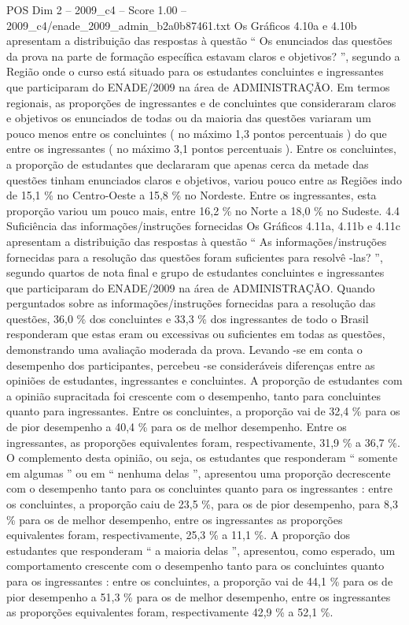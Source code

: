 \begin{textsample}{POS Dim 2 – 2009\_c4 – Score 1.00 – 2009\_c4/enade\_2009\_admin\_b2a0b87461.txt}
Os Gráficos 4.10a e 4.10b apresentam a distribuição das respostas à questão “ Os enunciados das questões da prova na parte de formação específica estavam claros e objetivos? ”, segundo a Região onde o curso está situado para os estudantes concluintes e ingressantes que participaram do ENADE/2009 na área de ADMINISTRAÇÃO.
Em termos regionais, as proporções de ingressantes e de concluintes que consideraram claros e objetivos os enunciados de todas ou da maioria das questões variaram um pouco menos entre os concluintes ( no máximo 1,3 pontos percentuais ) do que entre os ingressantes ( no máximo 3,1 pontos percentuais ).
Entre os concluintes, a proporção de estudantes que declararam que apenas cerca da metade das questões tinham enunciados claros e objetivos, variou pouco entre as Regiões indo de 15,1 \% no Centro-Oeste a 15,8 \% no Nordeste.
Entre os ingressantes, esta proporção variou um pouco mais, entre 16,2 \% no Norte a 18,0 \% no Sudeste. 4.4 Suficiência das informações/instruções fornecidas Os Gráficos 4.11a, 4.11b e 4.11c apresentam a distribuição das respostas à questão “ As informações/instruções fornecidas para a resolução das questões foram suficientes para resolvê -las? ”, segundo quartos de nota final e grupo de estudantes concluintes e ingressantes que participaram do ENADE/2009 na área de ADMINISTRAÇÃO.
Quando perguntados sobre as informações/instruções fornecidas para a resolução das questões, 36,0 \% dos concluintes e 33,3 \% dos ingressantes de todo o Brasil responderam que estas eram ou excessivas ou suficientes em todas as questões, demonstrando uma avaliação moderada da prova.
Levando -se em conta o desempenho dos participantes, percebeu -se consideráveis diferenças entre as opiniões de estudantes, ingressantes e concluintes.
A proporção de estudantes com a opinião supracitada foi crescente com o desempenho, tanto para concluintes quanto para ingressantes.
Entre os concluintes, a proporção vai de 32,4 \% para os de pior desempenho a 40,4 \% para os de melhor desempenho.
Entre os ingressantes, as proporções equivalentes foram, respectivamente, 31,9 \% a 36,7 \%.
O complemento desta opinião, ou seja, os estudantes que responderam “ somente em algumas ” ou em “ nenhuma delas ”, apresentou uma proporção decrescente com o desempenho tanto para os concluintes quanto para os ingressantes : entre os concluintes, a proporção caiu de 23,5 \%, para os de pior desempenho, para 8,3 \% para os de melhor desempenho, entre os ingressantes as proporções equivalentes foram, respectivamente, 25,3 \% a 11,1 \%.
A proporção dos estudantes que responderam “ a maioria delas ”, apresentou, como esperado, um comportamento crescente com o desempenho tanto para os concluintes quanto para os ingressantes : entre os concluintes, a proporção vai de 44,1 \% para os de pior desempenho a 51,3 \% para os de melhor desempenho, entre os ingressantes as proporções equivalentes foram, respectivamente 42,9 \% a 52,1 \%.

\end{textsample}
